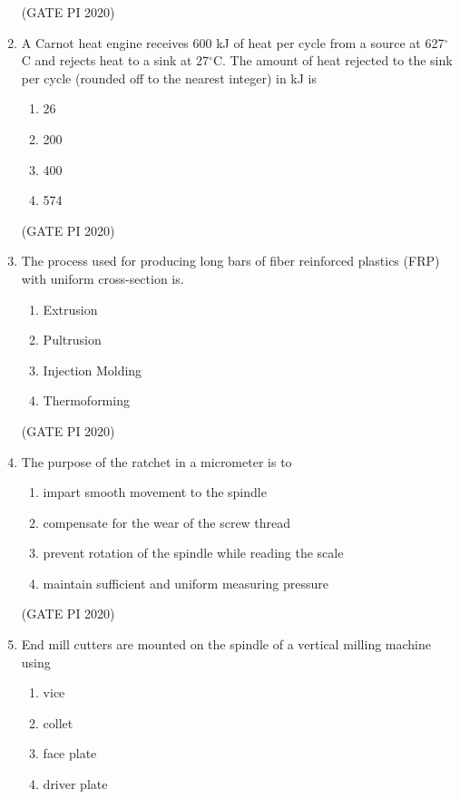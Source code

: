\documentclass[journal,12pt,onecolumn]{IEEEtran}
\theoremstyle{remark}
\begin{document}
\begin{enumerate}
\hfill (GATE PI 2020)

\item A Carnot heat engine receives 600 kJ of heat per cycle from a source at 627$^\circ$C and rejects heat to a sink at 27$^\circ$C. The amount of heat rejected to the sink per cycle (rounded off to the nearest integer) in kJ is 

\begin{enumerate}
    \item 26
    \item 200
    \item 400
    \item 574
\end{enumerate}

\hfill (GATE PI 2020)

\item The process used for producing long bars of fiber reinforced plastics (FRP) with uniform cross-section is.

\begin{enumerate}
    \item Extrusion
    \item Pultrusion
    \item Injection Molding
    \item Thermoforming
\end{enumerate}

\hfill (GATE PI 2020)

\item The purpose of the ratchet in a micrometer is to

\begin{enumerate}
\item impart smooth movement to the spindle
\item compensate for the wear of the screw thread
\item prevent rotation of the spindle while reading the scale
\item maintain sufficient and uniform measuring pressure
\end{enumerate}

\hfill (GATE PI 2020)

\item End mill cutters are mounted on the spindle of a vertical milling machine using
\begin{enumerate}
    \item vice
    \item collet
    \item face plate
    \item driver plate
\end{enumerate}


\end{enumerate}
\end{document}
